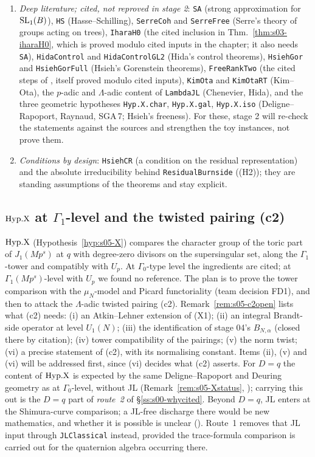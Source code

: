 \begin{enumerate}[label=(\Alph*)]
\item \emph{Deep literature; cited, not reproved in stage 2}: \texttt{SA} (strong approximation for $\mathrm{SL}_1(B)$),
  \texttt{HS} (Hasse--Schilling), \texttt{SerreCoh} and \texttt{SerreFree} (Serre's theory of groups acting on trees),
  \texttt{IharaH0} (the cited inclusion in Thm.~\ref{thm:s03-iharaH0}, which is proved modulo cited inputs in the chapter; it also needs \texttt{SA}), \texttt{HidaControl} and \texttt{HidaControlGL2} (Hida's control
  theorems), \texttt{HsiehGor} and \texttt{HsiehGorFull} (Hsieh's Gorenstein theorems), \texttt{FreeRankTwo} (the cited steps of
  , itself proved modulo cited inputs), \texttt{KimOta} and \texttt{KimOtaRT} (Kim--Ota), the $p$-adic and $\Lambda$-adic content of
  \texttt{LambdaJL} (Chenevier, Hida), and the three geometric hypotheses \texttt{Hyp.X.char}, \texttt{Hyp.X.gal},
  \texttt{Hyp.X.iso} (Deligne--Rapoport, Raynaud, SGA\,7; Hsieh's freeness). For these, stage 2 will re-check the statements
  against the sources and strengthen the toy instances, not prove them.
\item \emph{Conditions by design}: \texttt{HsiehCR} (a condition on the residual representation) and the absolute
  irreducibility behind \texttt{ResidualBurnside} ((H2)); they are standing assumptions of the theorems and stay explicit.
\end{enumerate}

\subsection{$\mathrm{Hyp.X}$ at $\Gamma_1$-level and the twisted pairing (c2)}\label{ss:stage2-hypX}
$\mathrm{Hyp.X}$ (Hypothesis~\ref{hyp:s05-X}) compares the character group of the toric part of $J_1(Mp^s)$ at $q$ with degree-zero
divisors on the supersingular set, along the $\Gamma_1$-tower and compatibly with $U_p$. At $\Gamma_0$-type level the
ingredients are cited; at $\Gamma_1(Mp^s)$-level with $U_p$ we found no reference. The plan is to prove the tower comparison
with the $\mu_N$-model and Picard functoriality (team decision FD1), and then to attack the $\Lambda$-adic twisted pairing
(c2). Remark~\ref{rem:s05-c2open} lists what (c2) needs: (i) an Atkin--Lehner extension of (X1); (ii) an integral Brandt-side
operator at level $U_1(N)$; (iii) the identification of stage 04's $B_{N,\alpha}$ (closed there by citation); (iv) tower
compatibility of the pairings; (v) the norm twist; (vi) a precise statement of (c2), with its normalising constant. Items
(ii), (v) and (vi) will be addressed first, since (vi) decides what (c2) asserts. For $D=q$ the content of $\mathrm{Hyp.X}$ is expected by the same
Deligne--Rapoport and Deuring geometry as at $\Gamma_0$-level, without JL (Remark~\ref{rem:s05-Xstatus}, \stexp); carrying this out is
the $D=q$ part of \emph{route~2} of \S\ref{ss:s00-whycited}. Beyond $D=q$, JL enters at the Shimura-curve comparison; a JL-free
discharge there would be new mathematics, and whether it is possible is unclear (\stopen). Route~1 removes that JL input through
\texttt{JLClassical} instead, provided the trace-formula comparison is carried out for the quaternion algebra occurring there.

